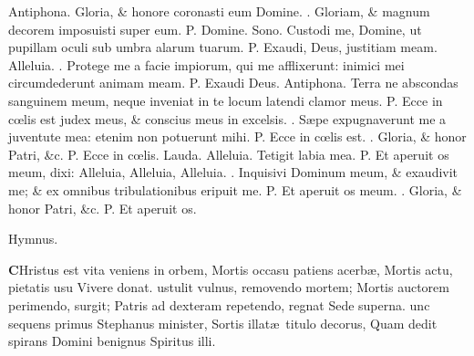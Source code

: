 \documentclass[letter,11pt]{book}
\makeatletter
\DeclareRobustCommand{\Vbar}{\vers@resp{-0.1em}{V}}
\newcommand{\vers@resp@sym}{\raisebox{0.2ex}{\rotatebox[origin=c]{-20}{$\m@th\rceil$}}}
\newcommand{\vers@resp}[2]{%
  {\ooalign{\hidewidth\kern#1\vers@resp@sym\hidewidth\cr#2\cr}}%
}%
\def\P{\color{Red} P. \color{black}}
\def\V{\color{Red} \Vbar . \color{black}}
\makeatother
\begin{document}
\begin{multicols*}{2}
\par \noindent \color{Red} Antiphona. \color{black} Gloria, \& honore coronasti eum Domine. \V Gloriam, \& magnum decorem imposuisti super eum. \P Domine.
\newline \color{Red} Sono. \color{black} Custodi me, Domine, ut pupillam oculi sub umbra alarum tuarum. \P Exaudi, Deus, justitiam meam. Alleluia. \V Protege me a facie impiorum, qui me afflixerunt: inimici mei circumdederunt animam meam. \P Exaudi Deus.
\newline \color{Red} Antiphona. \color{black} Terra ne abscondas sanguinem meum, neque inveniat in te locum latendi clamor meus. \P Ecce in c\oe lis est judex meus, \& conscius meus in excelsis. \V S\ae pe expugnaverunt me a juventute mea: etenim non potuerunt mihi. \P Ecce in c\oe lis est. \V Gloria, \& honor Patri, \&c. \P Ecce in c\oe lis.
\newline \color{Red} Lauda. \color{black} Alleluia. Tetigit labia mea. \P Et aperuit os meum, dixi: Alleluia, Alleluia, Alleluia. \V Inquisivi Dominum meum, \& exaudivit me; \& ex omnibus tribulationibus eripuit me. \P Et aperuit os meum. \V Gloria, \& honor Patri, \&c. \P Et aperuit os.
\vspace{-.5em} \begin{center} \color{Red} Hymnus. \color{black} \end{center} \vspace{-.5em}
\lettrine[lines=2]{\bfseries \color{Red} C}{}Hristus est vita veniens in orbem,
\newline Mortis occasu patiens acerb\ae ,
\newline \indent Mortis actu, pietatis usu
\newline \indent \indent Vivere donat.
ustulit vulnus, removendo mortem;
\newline \indent Mortis auctorem perimendo, surgit;
\newline \indent Patris ad dexteram repetendo, regnat
\newline \indent \indent Sede superna.
unc sequens primus Stephanus minister,
\newline \indent Sortis illat\ae \ titulo decorus,
\newline \indent Quam dedit spirans Domini benignus
\newline \indent \indent Spiritus illi.

\end{multicols*}
\end{document}

